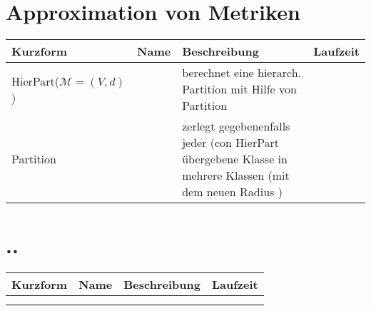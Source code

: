 \section{Approximation von Metriken}
\begin{tabularx}{\textwidth}{|l|l|X|l|} \hline
Kurzform & Name & Beschreibung & Laufzeit\\ \hline \hline
 HierPart($\mathcal{M} = (V, d)$) &  & berechnet eine hierarch. Partition mit Hilfe von Partition &  \\ \hline
 Partition &  & zerlegt gegebenenfalls jeder (con HierPart übergebene Klasse in mehrere Klassen (mit dem neuen Radius )&  \\ \hline
\end{tabularx}




\section{..}
\begin{tabularx}{\textwidth}{|l|X|X|X|} \hline
Kurzform & Name & Beschreibung & Laufzeit\\ \hline \hline
  &  &  &  \\ \hline
  &  &  &  \\ \hline
\end{tabularx}